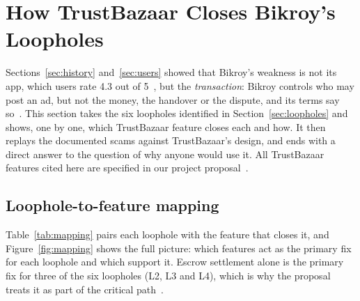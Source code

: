\section{How TrustBazaar Closes Bikroy's Loopholes}
\label{sec:solution}

Sections~\ref{sec:history} and~\ref{sec:users} showed that Bikroy's weakness is not its app,
which users rate 4.3 out of 5~\cite{play_store}, but the \emph{transaction}: Bikroy controls who
may post an ad, but not the money, the handover or the dispute, and its terms say
so~\cite{bikroy_terms}. This section takes the six loopholes identified in
Section~\ref{sec:loopholes} and shows, one by one, which TrustBazaar feature closes each and
how. It then replays the documented scams against TrustBazaar's design, and ends with a direct
answer to the question of why anyone would use it. All TrustBazaar features cited here are
specified in our project proposal~\cite{proposal}.

\subsection{Loophole-to-feature mapping}

Table~\ref{tab:mapping} pairs each loophole with the feature that closes it, and
Figure~\ref{fig:mapping} shows the full picture: which features act as the primary fix for each
loophole and which support it. Escrow settlement alone is the primary fix for three of the six
loopholes (L2, L3 and L4), which is why the proposal treats it as part of the critical
path~\cite{proposal}.

